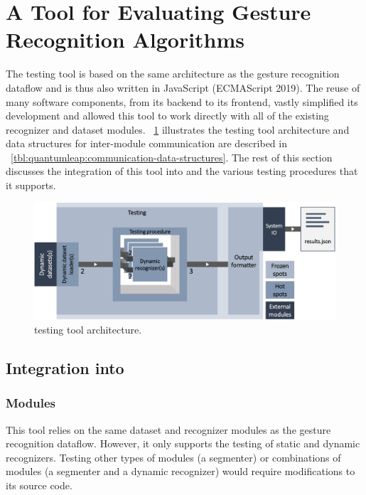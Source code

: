 \section{A Tool for Evaluating Gesture Recognition Algorithms} \label{sec:quantumleap-testing:description}
The \ql testing tool is based on the same architecture as the gesture recognition dataflow and is thus also written in JavaScript (ECMAScript 2019). The reuse of many \ql software components, from its backend to its frontend, vastly simplified its development and allowed this tool to work directly with all of the existing recognizer and dataset modules. \fig~\ref{fig:quantumleap-testing:archi} illustrates the testing tool architecture and data structures for inter-module communication are described in \tab~\ref{tbl:quantumleap:communication-data-structures}.
%
The rest of this section discusses the integration of this tool into \ql and the various testing procedures that it supports.

\begin{figure}[t]
  \centering
  \includegraphics[width=\linewidth]{Figures/QuantumLeapTesting/quantumleap-testing.pdf}
  \vspace{-8pt}
  \caption{\ql testing tool architecture.}
  \label{fig:quantumleap-testing:archi}
\end{figure}

\subsection{Integration into \ql} \label{sec:quantumleap-testing:description:ql-integration}
\subsubsection{Modules} \label{sec:quantumleap-testing:description:ql-integration:modules}
This tool relies on the same dataset and recognizer modules as the \ql gesture recognition dataflow. However, it only supports the testing of static and dynamic recognizers. Testing other types of modules (\eg a segmenter) or combinations of modules (\eg a segmenter and a dynamic recognizer) would require modifications to its source code.

